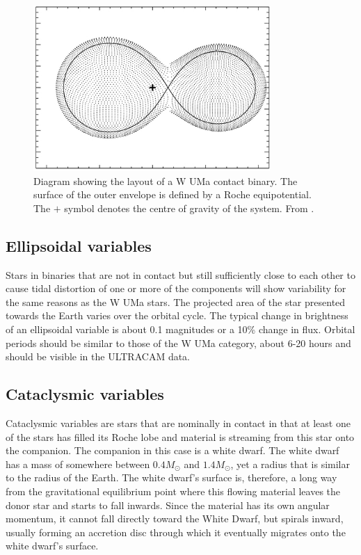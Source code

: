 \begin{figure}
\centering
\includegraphics[width=90mm]{images/wuma_diagram.png}
\caption{Diagram showing the layout of a {W UMa} contact binary. The surface of the outer envelope is defined by a Roche equipotential. The $+$ symbol denotes the centre of gravity of the system.  From \cite{0004-637X-764-1-62}. }
\label{fig:wumadiagram}
\end{figure}

\subsection{Ellipsoidal variables}
Stars in binaries that are not in contact but still sufficiently close to each other to cause tidal distortion of one or more of the components will show variability for the same reasons as the {W UMa} stars. The projected area of the star presented towards the Earth varies over the orbital cycle. The typical change in brightness of an ellipsoidal variable is about 0.1 magnitudes or a 10\% change in flux. Orbital periods should be similar to those of the {W UMa} category, about 6-20 hours and should be visible in the ULTRACAM data. 

\subsection{Cataclysmic variables}
Cataclysmic variables are stars that are nominally in contact in that at least one of the stars has filled its Roche lobe and material is streaming from this star onto the companion. The companion in this case is a white dwarf. The white dwarf has a mass of somewhere between $0.4 M_{\odot}$ and $1.4 M_{\odot}$, yet a radius that is similar to the radius of the Earth. The white dwarf's surface is, therefore, a long way from the gravitational equilibrium point where this flowing material leaves the donor star and starts to fall inwards. Since the material has its own angular momentum, it cannot fall directly toward the White Dwarf, but spirals inward, usually forming an accretion disc through which it eventually migrates onto the white dwarf's surface. 


